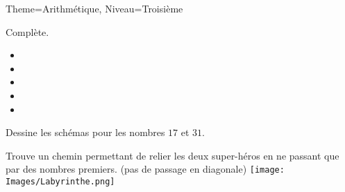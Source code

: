 \documentclass[11pt]{article}
\begin{document}
\begin{multicols}{2}
\begin{Maquette}[Fiche]{Theme=Arithmétique, Niveau=Troisième}
\begin{exercice}
    Complète.
    \begin{itemize}[label={}]
        \item {}
        \item {}
        \item {}
        \item {}
        \item {}
    \end{itemize}
    Dessine les schémas pour les nombres $17$ et $31$.
\end{exercice}

\begin{exercice}
    Trouve un chemin permettant de relier les deux super-héros en ne passant que par des nombres premiers. (pas de passage en diagonale)
    \texttt{[image: Images/Labyrinthe.png]}
\end{exercice}

\end{Maquette}

\end{multicols}
\end{document}
